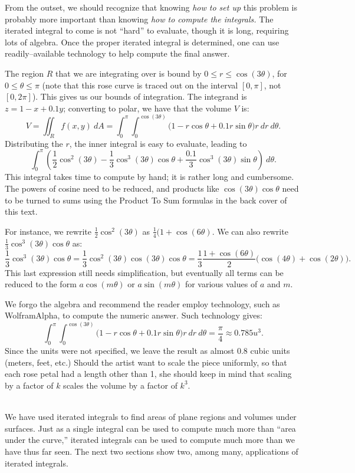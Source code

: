{From the outset, we should recognize that knowing \textit{how to set up} this problem is probably more important than knowing \textit{how to compute the integrals.} The iterated integral to come is not ``hard'' to evaluate, though it is long, requiring lots of algebra. Once the proper iterated integral is determined, one can use readily--available technology to help  compute the final answer. 

The region $R$ that we are integrating over is bound by $0\leq r\leq \cos(3\theta)$, for $0\leq \theta\leq\pi$ (note that this rose curve is traced out on the interval $[0,\pi]$, not $[0,2\pi]$). This gives us our bounds of integration. The integrand is $z=1-x+0.1y$; converting to polar, we have that the volume $V$ is:
$$V = \iint_R f(x,y)\ dA = \int_0^\pi\int_0^{\cos(3\theta)}\big(1-r\cos\theta+0.1r\sin\theta\big)r\ dr\ d\theta.$$
Distributing the $r$, the inner integral is easy to evaluate, leading to 
$$ \int_0^\pi \left(\frac12\cos^2(3\theta)-\frac13\cos^3(3\theta)\cos\theta+\frac{0.1}3\cos^3(3\theta)\sin\theta\right)\ d\theta.$$
This integral takes time to compute by hand; it is rather long and cumbersome. The powers of cosine need to be reduced, and products like $\cos(3\theta)\cos\theta$ need to be turned to sums using the Product To Sum formulas in the back cover of this text. 

For instance, we rewrite $\frac12\cos^2(3\theta)$ as $\frac14(1+\cos(6\theta)$. We can also rewrite $\frac13\cos^3(3\theta)\cos\theta$ as: 
$$\frac13\cos^3(3\theta)\cos\theta = \frac13\cos^2(3\theta)\cos(3\theta)\cos\theta = \frac13\frac{1+\cos(6\theta)}2\big(\cos(4\theta)+\cos(2\theta)\big).$$
This last expression still needs simplification, but eventually all terms can be reduced to the form $a\cos(m\theta)$ or $a\sin(m\theta)$ for various values of $a$ and $m$.

We forgo the algebra and recommend the reader employ technology, such as WolframAlpha\textregistered, to compute the numeric answer. Such technology gives:
$$\int_0^\pi\int_0^{\cos(3\theta)}\big(1-r\cos\theta+0.1r\sin\theta\big)r\ dr\ d\theta = \frac{\pi}{4} \approx 0.785u^3.$$
Since the units were not specified, we leave the result as almost $0.8$ cubic units (meters, feet, etc.) Should the artist want to scale the piece uniformly, so that each rose petal had a length other than 1, she should keep in mind that scaling by a factor of $k$ scales the volume by a factor of $k^3$. 
}\\

We have used iterated integrals to find areas of plane regions and volumes under surfaces. Just as a single integral can be used to compute much more than ``area under the curve,'' iterated integrals can be used to compute much more than we have thus far seen. The next two sections show two, among many, applications of iterated integrals.

